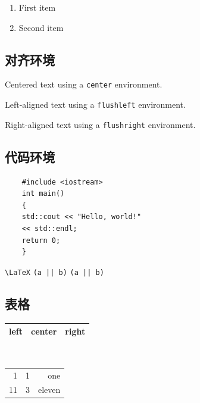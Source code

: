 \documentclass{ctexart}
\begin{document}
\renewcommand{\labelenumi}{\Alph{enumi}>}
\begin{enumerate}
    \item First item
    \item Second item
\end{enumerate}

\subsection*{对齐环境}

\begin{center}
    Centered text using a
    \verb|center| environment.
\end{center}
\begin{flushleft}
    Left-aligned text using a
    \verb|flushleft| environment.
\end{flushleft}
\begin{flushright}
    Right-aligned text using a
    \verb|flushright| environment.
\end{flushright}


\subsection*{代码环境}

\begin{verbatim}
    #include <iostream>
    int main()
    {
    std::cout << "Hello, world!"
    << std::endl;
    return 0;
    }
\end{verbatim}

\verb|\LaTeX|
\verb+(a || b)+ \verb*+(a || b)+

\subsection*{表格}

\begin{tabular}{|l|c|r|}
    \hline
    left & center & right \\
    \hline
\end{tabular}
\\[10pt]

\begin{tabular}{@{} r@{:}lr @{}}
    \hline
    1  & 1 & one    \\
    11 & 3 & eleven \\
    \hline
\end{tabular}
\\[10pt]
\end{document}
